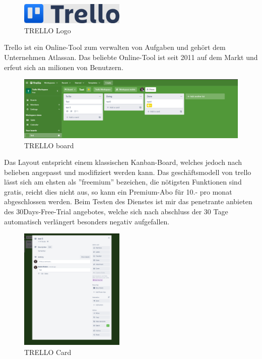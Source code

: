 
\begin{figure}[H]
    \begin{center}
        \includegraphics[width=5cm]{../content/images/Trello/TrelloLogo.png}
        \caption{TRELLO Logo}
    \end{center}
\end{figure}

Trello ist ein Online-Tool zum verwalten von Aufgaben und gehört dem Unternehmen Atlassan. 
Das beliebte Online-Tool ist seit 2011 auf dem Markt und erfeut sich an milionen von Benutzern.


\begin{figure}[H]
    \begin{center}
        \includegraphics[width=16cm]{../content/images/Trello/TrelloBoard.png}
        \caption{TRELLO board}
    \end{center}
\end{figure}

Das Layout entspricht einem klassischen Kanban-Board, welches jedoch nach belieben angepasst und
modifiziert werden kann. Das geschäftsmodell von trello lässt sich am ehsten als ''freemium'' bezeichen, die nötigsten Funktionen
sind gratis, reicht dies nicht aus, so kann ein Premium-Abo für 10.- pro monat abgeschlossen werden.
Beim Testen des Dienstes ist mir das penetrante anbieten des 30Days-Free-Trial angebotes, welche sich nach abschluss der 30 Tage automatisch verlängert
besonders negativ aufgefallen.\\
\space
\begin{figure}[H]
    \begin{center}
        \includegraphics[width=5cm]{../content/images/Trello/TrelloCard.png}
        \caption{TRELLO Card}
    \end{center}
\end{figure}

